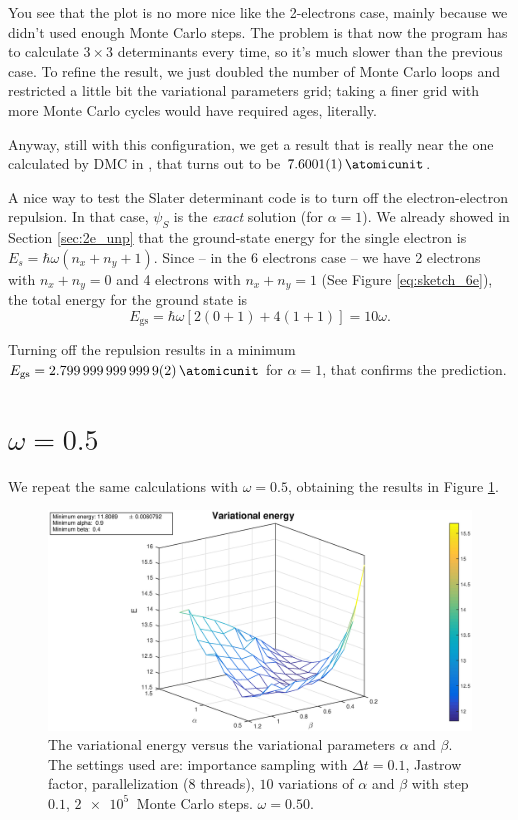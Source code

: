 \documentclass[a4paper,twoside,11pt]{book}
\begin{document}
You see that the plot is no more nice like the 2-electrons case, mainly because we didn't used enough Monte Carlo steps. The problem is that now the program has to calculate $3 \times 3$ determinants every time, so it's much slower than the previous case. To refine the result, we just doubled the number of Monte Carlo loops and restricted a little bit the variational parameters grid; taking a finer grid with more Monte Carlo cycles would have required ages, literally.

Anyway, still with this configuration, we get a result that is really near the one calculated by DMC in \cite{pede}, that turns out to be $\SI{7.6001 \pm 0.0001}{\atomicunit}$.

A nice way to test the Slater determinant code is to turn off the electron-electron repulsion. In that case, $\psi_S$ is the \emph{exact} solution (for $\alpha = 1$). We already showed in Section \ref{sec:2e_unp} that the ground-state energy for the single electron is $E_s = \hbar\omega(n_x + n_y + 1)$. Since -- in the 6 electrons case -- we have 2 electrons with $n_x + n_y = 0$ and 4 electrons with $n_x + n_y = 1$ (See Figure \ref{eq:sketch_6e}), the total energy for the ground state is
\begin{equation}
	E_{\text{gs}} = \hbar\omega\left[2(0+1)+4(1+1)\right] = 10\omega.
\end{equation}

Turning off the repulsion results in a minimum $E_{\text{gs}} = \SI{2.7999999999999 \pm 0.0000000000002}{\atomicunit}$ for $\alpha=1$, that confirms the prediction.

\section{$\omega = 0.5$}
We repeat the same calculations with $\omega=0.5$, obtaining the results in Figure \ref{fig:6e-050-rep}.
\begin{figure}[H]
	\centering
	\includegraphics[width=\textwidth]{6e-050-rep}
	\caption{The variational energy versus the variational parameters $\alpha$ and $\beta$. The settings used are: importance sampling with $\Delta t = 0.1$, Jastrow factor, parallelization (8 threads), $10$ variations of $\alpha$ and $\beta$ with step $0.1$, $\SI{2e5}{}$ Monte Carlo steps. $\omega=0.50$.}
	\label{fig:6e-050-rep}
\end{figure}
\end{document}
